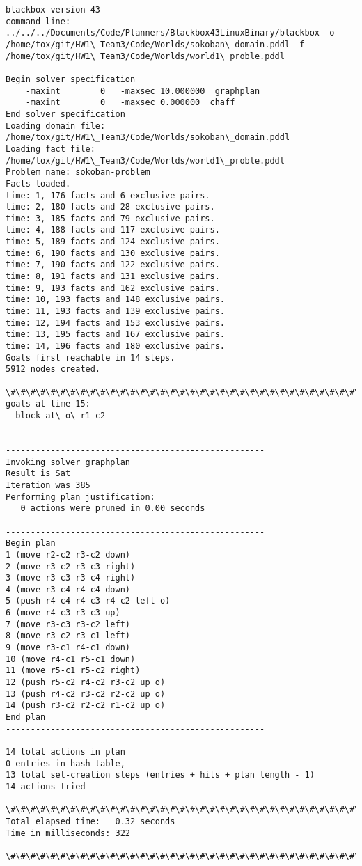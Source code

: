 \documentclass{article}
\begin{document}
    \begin{Verbatim}[commandchars=\\\{\}]
blackbox version 43
command line:  ../../../Documents/Code/Planners/Blackbox43LinuxBinary/blackbox -o /home/tox/git/HW1\_Team3/Code/Worlds/sokoban\_domain.pddl -f /home/tox/git/HW1\_Team3/Code/Worlds/world1\_proble.pddl

Begin solver specification
    -maxint        0   -maxsec 10.000000  graphplan
    -maxint        0   -maxsec 0.000000  chaff
End solver specification
Loading domain file: /home/tox/git/HW1\_Team3/Code/Worlds/sokoban\_domain.pddl
Loading fact file: /home/tox/git/HW1\_Team3/Code/Worlds/world1\_proble.pddl
Problem name: sokoban-problem
Facts loaded.
time: 1, 176 facts and 6 exclusive pairs.
time: 2, 180 facts and 28 exclusive pairs.
time: 3, 185 facts and 79 exclusive pairs.
time: 4, 188 facts and 117 exclusive pairs.
time: 5, 189 facts and 124 exclusive pairs.
time: 6, 190 facts and 130 exclusive pairs.
time: 7, 190 facts and 122 exclusive pairs.
time: 8, 191 facts and 131 exclusive pairs.
time: 9, 193 facts and 162 exclusive pairs.
time: 10, 193 facts and 148 exclusive pairs.
time: 11, 193 facts and 139 exclusive pairs.
time: 12, 194 facts and 153 exclusive pairs.
time: 13, 195 facts and 167 exclusive pairs.
time: 14, 196 facts and 180 exclusive pairs.
Goals first reachable in 14 steps.
5912 nodes created.

\#\#\#\#\#\#\#\#\#\#\#\#\#\#\#\#\#\#\#\#\#\#\#\#\#\#\#\#\#\#\#\#\#\#\#\#\#\#\#\#\#\#\#\#\#\#\#\#\#\#\#\#
goals at time 15:
  block-at\_o\_r1-c2 


----------------------------------------------------
Invoking solver graphplan
Result is Sat
Iteration was 385
Performing plan justification:
   0 actions were pruned in 0.00 seconds

----------------------------------------------------
Begin plan
1 (move r2-c2 r3-c2 down)
2 (move r3-c2 r3-c3 right)
3 (move r3-c3 r3-c4 right)
4 (move r3-c4 r4-c4 down)
5 (push r4-c4 r4-c3 r4-c2 left o)
6 (move r4-c3 r3-c3 up)
7 (move r3-c3 r3-c2 left)
8 (move r3-c2 r3-c1 left)
9 (move r3-c1 r4-c1 down)
10 (move r4-c1 r5-c1 down)
11 (move r5-c1 r5-c2 right)
12 (push r5-c2 r4-c2 r3-c2 up o)
13 (push r4-c2 r3-c2 r2-c2 up o)
14 (push r3-c2 r2-c2 r1-c2 up o)
End plan
----------------------------------------------------

14 total actions in plan
0 entries in hash table, 
13 total set-creation steps (entries + hits + plan length - 1)
14 actions tried

\#\#\#\#\#\#\#\#\#\#\#\#\#\#\#\#\#\#\#\#\#\#\#\#\#\#\#\#\#\#\#\#\#\#\#\#\#\#\#\#\#\#\#\#\#\#\#\#\#\#\#\#
Total elapsed time:   0.32 seconds
Time in milliseconds: 322

\#\#\#\#\#\#\#\#\#\#\#\#\#\#\#\#\#\#\#\#\#\#\#\#\#\#\#\#\#\#\#\#\#\#\#\#\#\#\#\#\#\#\#\#\#\#\#\#\#\#\#\#
    \end{Verbatim}
\end{document}
